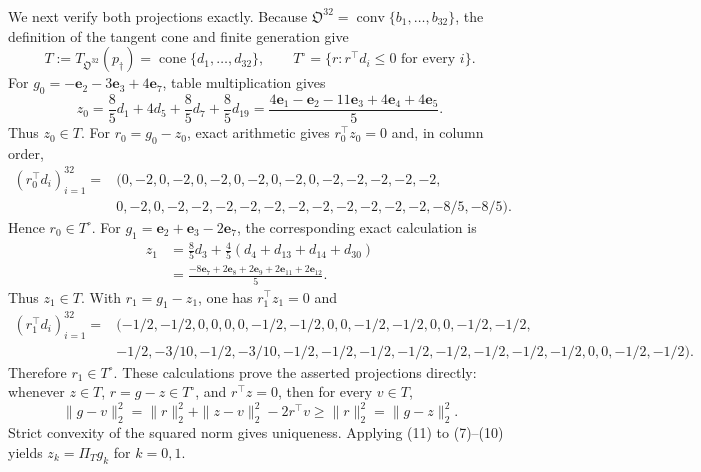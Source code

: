 We next verify both projections exactly.  Because \(\mathfrak O^{32}=\operatorname{conv}\{b_1,\ldots,b_{32}\}\), the definition of the tangent cone and finite generation give
\[
T:=T_{\mathfrak O^{32}}(p_\dagger)
=\operatorname{cone}\{d_1,\ldots,d_{32}\},
\qquad
T^\circ=\{r:r^\top d_i\leq0\text{ for every }i\}.
\tag{6}
\]
For \(g_0=-\mathbf e_2-3\mathbf e_3+4\mathbf e_7\), table multiplication gives
\[
z_0=\frac85d_1+4d_5+\frac85d_7+\frac85d_{19}
=\frac{4\mathbf e_1-\mathbf e_2-11\mathbf e_3+4\mathbf e_4+4\mathbf e_5}{5}.
\tag{7}
\]
Thus \(z_0\in T\).  For \(r_0=g_0-z_0\), exact arithmetic gives \(r_0^\top z_0=0\) and, in column order,
\[
\begin{split}
(r_0^\top d_i)_{i=1}^{32}={}&(0,-2,0,-2,0,-2,0,-2,
0,-2,0,-2,-2,-2,-2,-2,\\
&0,-2,0,-2,-2,-2,-2,-2,-2,-2,-2,-2,-2,-2,-8/5,-8/5).
\end{split}
\tag{8}
\]
Hence \(r_0\in T^\circ\).  For \(g_1=\mathbf e_2+\mathbf e_3-2\mathbf e_7\), the corresponding exact calculation is
\[
\begin{split}
z_1&=\frac85d_3+\frac45(d_4+d_{13}+d_{14}+d_{30})\\
&=\frac{-8\mathbf e_7+2\mathbf e_8+2\mathbf e_9+2\mathbf e_{11}+2\mathbf e_{12}}5.
\end{split}
\tag{9}
\]
Thus \(z_1\in T\).  With \(r_1=g_1-z_1\), one has \(r_1^\top z_1=0\) and
\[
\begin{split}
(r_1^\top d_i)_{i=1}^{32}={}&(-1/2,-1/2,0,0,0,0,-1/2,-1/2,
0,0,-1/2,-1/2,0,0,-1/2,-1/2,\\
&-1/2,-3/10,-1/2,-3/10,-1/2,-1/2,-1/2,-1/2,
-1/2,-1/2,-1/2,-1/2,0,0,-1/2,-1/2).
\end{split}
\tag{10}
\]
Therefore \(r_1\in T^\circ\).  These calculations prove the asserted projections directly: whenever \(z\in T\), \(r=g-z\in T^\circ\), and \(r^\top z=0\), then for every \(v\in T\),
\[
\|g-v\|_2^2
=\|r\|_2^2+\|z-v\|_2^2-2r^\top v
\geq \|r\|_2^2
=\|g-z\|_2^2.
\tag{11}
\]
Strict convexity of the squared norm gives uniqueness.  Applying (11) to (7)--(10) yields \(z_k=\Pi_Tg_k\) for \(k=0,1\).

